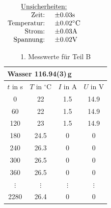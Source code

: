 \documentclass[11pt,a4paper]{article}
\begin{document}
\begin{table}[p]
\centering
$\begin{array}{rl}
\multicolumn{2}{c}{\textrm{\underline{Unsicherheiten:}}}\\
\textrm{Zeit: } & \pm 0.03 \textrm{s}\\
\textrm{Temperatur: } & \pm 0.02 \textrm{\celsius}\\
\textrm{Strom: } & \pm 0.03 \textrm{A}\\
\textrm{Spannung: } & \pm 0.02 \textrm{V}
\end{array}$
\begin{tabular}{|c|c|c|c|}
\multicolumn{4}{l}{Wasser 116.94(3)\,g}\\
\hline
$t$ in s & $T$ in $^\circ\textrm{C}$ & $I$ in A & $U$ in V \\
\hline 
0   & 22   & 1.5 & 14.9 \\
60  & 22   & 1.5 & 14.9 \\
120 & 23   & 1.5 & 14.9 \\
180 & 24.5 & 0   & 0    \\
240 & 26.3 & 0   & 0    \\ 
300 & 26.5 & 0   & 0    \\ 
360 & 26.5 & 0   & 0	\\ 
$\vdots$ & $\vdots$ & $\vdots$ & $\vdots$ \\
2280 & 26.4 & 0 & 0 \\
\hline
\end{tabular}
\renewcommand\thetable{T4}
\caption{1. Messwerte für Teil B}
\label{tab:B1}
\end{table}
\end{document}
